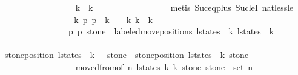 \begin{isabellebody}
\ \ \ \ \ \ \ \ \ \ \ \ \ \ \ \ \isamarkupfalse%
\ {\isacharbackquoteopen}k{}\ {\isacharless}\ k{}{\isacharbackquoteclose}\isanewline
\ \ \ \ \ \ \ \ \ \ \ \ \ \ \ \ \isamarkupfalse%
\ {\isacharparenleft}metis\ Suc{\isacharunderscore}eq{\isacharunderscore}plus{}\ Suc{\isacharunderscore}leI\ nat{\isacharunderscore}less{\isacharunderscore}le{\isacharparenright}\isanewline
\ \ \ \ \ \ \ \ \ \ \ \ \ \ \isamarkupfalse%
\ \isamarkupfalse%
\ k{\isacharprime}\ p{}{\isacharprime}{\isacharprime}\ p{}{\isacharprime}{\isacharprime}\ \ {\isachardoublequoteopen}k{}\ {\isacharplus}\ {}\ {\isasymle}\ k{\isacharprime}{\isachardoublequoteclose}\ {\isachardoublequoteopen}k{\isacharprime}\ {\isacharless}\ k{}{\isachardoublequoteclose}\isanewline
\ \ \ \ \ \ \ \ \ \ \ \ \ \ \ \ {\isachardoublequoteopen}{\isacharparenleft}p{}{\isacharprime}{\isacharprime}{\isacharcomma}\ p{}{\isacharprime}{\isacharprime}{\isacharcomma}\ stone{\isacharparenright}\ {\isacharequal}\ labeled{\isacharunderscore}move{\isacharunderscore}positions\ {\isacharparenleft}l{\isacharunderscore}states\ {\isacharbang}\ k{\isacharprime}{\isacharparenright}\ {\isacharparenleft}l{\isacharunderscore}states\ {\isacharbang}\ {\isacharparenleft}k{\isacharprime}\ {\isacharplus}\ {}{\isacharparenright}{\isacharparenright}{\isachardoublequoteclose}\isanewline
\ \ \ \ \ \ \ \ \ \ \ \ \ \ \ \ \isamarkupfalse%
\ {\isacharbackquoteopen}stone{\isacharunderscore}position\ {\isacharparenleft}l{\isacharunderscore}states\ {\isacharbang}\ {\isacharparenleft}k{}\ {\isacharplus}\ {}{\isacharparenright}{\isacharparenright}\ stone\ {\isasymnoteq}\ stone{\isacharunderscore}position\ {\isacharparenleft}l{\isacharunderscore}states\ {\isacharbang}\ k{}{\isacharparenright}\ stone{\isacharbackquoteclose}\isanewline
\ \ \ \ \ \ \ \ \ \ \ \ \ \ \ \ \isamarkupfalse%
\ moved{\isacharunderscore}from{\isacharbrackleft}of\ n\ l{\isacharunderscore}states\ {\isachardoublequoteopen}k{}{\isacharplus}{}{\isachardoublequoteclose}\ {\isachardoublequoteopen}k{}{\isachardoublequoteclose}\ stone{\isacharbrackright}\ {\isacharbackquoteopen}stone\ {\isasymin}\ set\ {\isacharbrackleft}{}{\isachardot}{\isachardot}{\isacharless}n{\isacharbrackright}{\isacharbackquoteclose}\isanewline
\ \ \ \ \ \ \ \ \ \ \ \ \ \ \ \ \isamarkupfalse%

\end{isabellebody}
